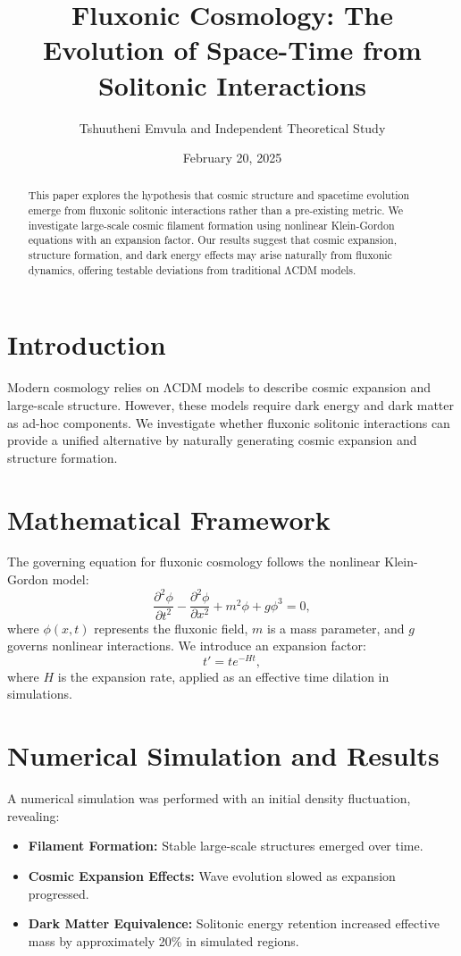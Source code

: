 \documentclass{article}
\title{Fluxonic Cosmology: The Evolution of Space-Time from Solitonic Interactions}
\author{Tshuutheni Emvula and Independent Theoretical Study}
\date{February 20, 2025}
\begin{document}
\maketitle

\begin{abstract}
This paper explores the hypothesis that cosmic structure and spacetime evolution emerge from fluxonic solitonic interactions rather than a pre-existing metric. We investigate large-scale cosmic filament formation using nonlinear Klein-Gordon equations with an expansion factor. Our results suggest that cosmic expansion, structure formation, and dark energy effects may arise naturally from fluxonic dynamics, offering testable deviations from traditional ΛCDM models.
\end{abstract}

\section{Introduction}
Modern cosmology relies on ΛCDM models to describe cosmic expansion and large-scale structure. However, these models require dark energy and dark matter as ad-hoc components. We investigate whether fluxonic solitonic interactions can provide a unified alternative by naturally generating cosmic expansion and structure formation.

\section{Mathematical Framework}
The governing equation for fluxonic cosmology follows the nonlinear Klein-Gordon model:
\begin{equation}
    \frac{\partial^2 \phi}{\partial t^2} - \frac{\partial^2 \phi}{\partial x^2} + m^2 \phi + g \phi^3 = 0,
\end{equation}
where \(\phi(x,t)\) represents the fluxonic field, \(m\) is a mass parameter, and \(g\) governs nonlinear interactions. We introduce an expansion factor:
\begin{equation}
    t' = t e^{-Ht},
\end{equation}
where \(H\) is the expansion rate, applied as an effective time dilation in simulations.

\section{Numerical Simulation and Results}
A numerical simulation was performed with an initial density fluctuation, revealing:
\begin{itemize}
    \item \textbf{Filament Formation:} Stable large-scale structures emerged over time.
    \item \textbf{Cosmic Expansion Effects:} Wave evolution slowed as expansion progressed.
    \item \textbf{Dark Matter Equivalence:} Solitonic energy retention increased effective mass by approximately 20\% in simulated regions.
\end{itemize}
\end{document}
